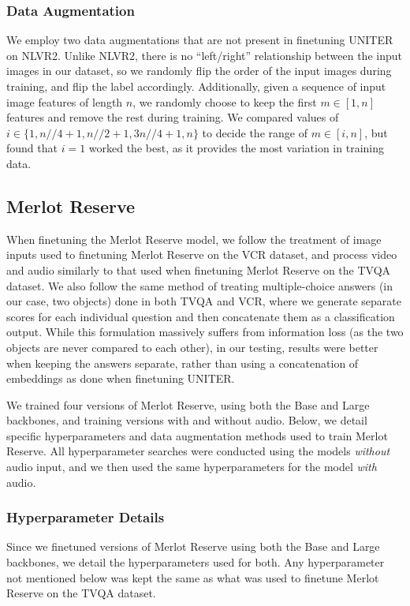 \documentclass[runningheads]{llncs}
\begin{document}
\subsubsection{Data Augmentation}

We employ two data augmentations that are not present in finetuning UNITER on NLVR2. Unlike NLVR2, there is no ``left/right'' relationship between the input images in our dataset, so we randomly flip the order of the input images during training, and flip the label accordingly. Additionally, given a sequence of input image features of length $n$, we randomly choose to keep the first $m \in [1, n]$ features and remove the rest during training. We compared values of $i \in \{1, n//4 + 1, n//2 + 1, 3n//4 + 1,  n\}$ to decide the range of $m \in [i, n]$, but found that $i = 1$ worked the best, as it provides the most variation in training data. 

\subsection{Merlot Reserve~\cite{zellers2022merlotreserve}}

When finetuning the Merlot Reserve model, we follow the treatment of image inputs used to finetuning Merlot Reserve on the VCR dataset, and process video and audio similarly to that used when finetuning Merlot Reserve on the TVQA dataset. We also follow the same method of treating multiple-choice answers (in our case, two objects) done in both TVQA and VCR, where we generate separate scores for each individual question and then concatenate them as a classification output. While this formulation massively suffers from information loss (as the two objects are never compared to each other), in our testing, results were better when keeping the answers separate, rather than using a concatenation of embeddings as done when finetuning UNITER.

We trained four versions of Merlot Reserve, using both the Base and Large backbones, and training versions with and without audio. Below, we detail specific hyperparameters and data augmentation methods used to train Merlot Reserve. All hyperparameter searches were conducted using the models \textit{without} audio input, and we then used the same hyperparameters for the model \textit{with} audio. 

\subsubsection{Hyperparameter Details} Since we finetuned versions of Merlot Reserve using both the Base and Large backbones, we detail the hyperparameters used for both. Any hyperparameter not mentioned below was kept the same as what was used to finetune Merlot Reserve on the TVQA dataset. 
\end{document}
